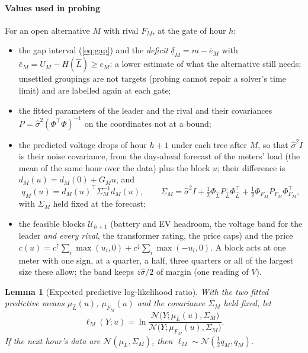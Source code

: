 \documentclass[journal,onecolumn,11pt]{IEEEtran}
\newtheorem{lemma}{Lemma}
\newcommand{\tp}{^{\top}}
\newcommand{\Uset}{\mathcal{U}}
\begin{document}
\paragraph*{Values used in probing} For an open alternative $M$ with rival $F_M$, at the gate of hour $h$:
\begin{itemize}
\item the gap interval (\ref{eq:gap}) and the \emph{deficit} $\underline\delta_M=m-\bar e_M$ with $\bar e_M=U_M-H(\hat L)\ge
e_M$: a lower estimate of what the alternative still needs; unsettled groupings are not targets (probing cannot repair a
solver's time limit) and are labelled again at each gate;
\item the fitted parameters of the leader and the rival and their covariances $P=\hat\sigma^2(\Phi\tp\Phi)^{-1}$ on the
coordinates not at a bound;
\item the predicted voltage drops of hour $h+1$ under each tree after $M$, so that $\hat\sigma^2I$ is their noise
covariance, from the day-ahead forecast of the meters' load (the mean of the same hour over the data) plus the block $u$;
their difference is $d_M(u)=d_M(0)+G_Mu$, and
\begin{equation}\label{eq:sep}
q_M(u)=d_M(u)\tp\Sigma_M^{-1}d_M(u),\qquad \Sigma_M=\hat\sigma^2I+\tfrac12\Phi_{\hat L}P_{\hat L}\Phi_{\hat L}\tp+\tfrac12\Phi_{F_M}P_{F_M}\Phi_{F_M}\tp,
\end{equation}
with $\Sigma_M$ held fixed at the forecast;
\item the feasible blocks $\Uset_{h+1}$ (battery and EV headroom, the voltage band for the leader \emph{and every rival}, the
transformer rating, the price caps) and the price $c(u)=c^\uparrow\sum_i\max(u_i,0)+c^\downarrow\sum_i\max(-u_i,0)$. A block
acts at one meter with one sign, at a quarter, a half, three quarters or all of the largest size these allow; the band keeps
$z\hat\sigma/2$ of margin (one reading of $V$).
\end{itemize}
\begin{lemma}[Expected predictive log-likelihood ratio]\label{lem:evidence}
With the two fitted predictive means $\mu_{\hat L}(u)$, $\mu_{F_M}(u)$ and the covariance $\Sigma_M$ held fixed, let
\begin{equation}\label{eq:llr}
\ell_M(Y;u)=\ln\frac{\mathcal N\big(Y;\mu_{\hat L}(u),\Sigma_M\big)}{\mathcal N\big(Y;\mu_{F_M}(u),\Sigma_M\big)} .
\end{equation}
If the next hour's data are $\mathcal N(\mu_{\hat L},\Sigma_M)$, then $\ell_M\sim\mathcal N(\tfrac12q_M,q_M)$.
\end{lemma}
\end{document}
